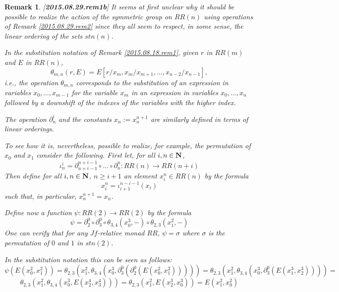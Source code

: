 \documentclass[11pt]{article}
\newtheorem{remark}[proposition]{Remark}
\newcommand{\llabel}[1]{\label{#1}[{\bf #1}]}
\newcommand{\sr}{\rightarrow}
\newcommand{\nn}{{\bf N\rm}}
\newcommand{\nat}{\nn}
\begin{document}
\begin{remark}\rm
\llabel{2015.08.29.rem1b}
It seems at first unclear why it should be possible to realize the action of the symmetric group on $RR(n)$ using operations of Remark \ref{2015.08.29.rem2} since they all seem to respect, in some sense, the linear ordering of the sets $stn(n)$. 

In the substitution notation of Remark \ref{2015.08.18.rem1}, given $r$ in $RR(m)$ and $E$ in $RR(n)$, 
%
$$\theta_{m,n}(r,E)=E[r/x_m,x_m/x_{m+1},\dots,x_{n-2}/x_{n-1}],$$
%
i.e., the operation $\theta_{m,n}$ corresponds to the substitution of an expression in variables $x_0,\dots,x_{m-1}$ for the variable $x_m$ in an expression in variables $x_0,\dots,x_n$ followed by a downshift of the indexes of the variables with the higher index. 

The operation $\partial_n^i$ and the constants $x_n:=x^{n+1}_{n}$ are similarly defined in terms of linear orderings.

To see how it is, nevertheless, possible to realize, for example, the permutation of $x_0$ and $x_1$ consider the following. First let, for all $i,n\in\nat$, 
%
$$\iota_n^i=\partial_{n+i-1}^{n+i-1}\circ \dots\circ \partial_n^n:RR(n)\sr RR(n+i)$$
%
Then define for all $i,n\in\nat$, $n\ge i+1$ an element $x^n_i\in RR(n)$ by the formula
%
$$x^n_i=\iota_{i+1}^{n-i-1}(x_i)$$
%
such that, in particular, $x^{n+1}_{n}=x_n$.

Define now a function $\psi:RR(2)\sr RR(2)$ by the formula
%
$$\psi=\partial^0_2\circ \partial^0_3\circ \theta_{3,4}(x_0^3,-)\circ \theta_{2,3}(x_1^2,-)$$
%
One can verify that for any $Jf$-relative monad $RR$, $\psi=\sigma$ where $\sigma$ is the permutation of $0$ and $1$ in $stn(2)$. 

In the substitution notation this can be seen as follows:
%
$$\psi(E(x^2_0,x_1^2))=\theta_{2,3}(x_1^2,\theta_{3,4}(x_0^3,\partial^0_3(\partial^0_2(E(x^2_0,x_1^2)))))=\theta_{2,3}(x_1^2,\theta_{3,4}(x_0^3,\partial^0_3(E(x^3_1,x^3_2))))=$$
$$\theta_{2,3}(x_1^2,\theta_{3,4}(x_0^3,E(x^4_2,x^4_3)))=\theta_{2,3}(x_1^2,E(x^3_2,x^3_0))=E(x^2_1,x^2_0)$$
%
\end{remark}
%
\end{document}
